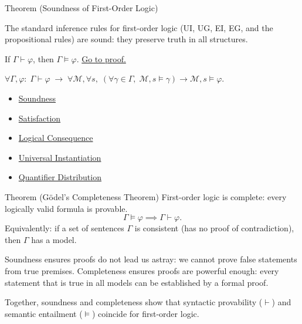 \begin{theorembox}{Theorem (Soundness of First-Order Logic)}
\begin{theorem}\label{thm:fol-sound}
The standard inference rules for first-order logic (UI, UG, EI, EG, and the
propositional rules) are sound: they preserve truth in all structures.

If $\Gamma \vdash \varphi$, then $\Gamma \models \varphi$.
\hyperref[prf:fol-sound]{Go to proof.}
\end{theorem}
\end{theorembox}

\begin{remark*}
$\forall \Gamma,\varphi:\; \Gamma\vdash\varphi \;\to\; \forall\mathcal{M},\forall s,\; (\forall\gamma\in\Gamma,\; \mathcal{M},s\models\gamma) \to \mathcal{M},s\models\varphi$.
\end{remark*}

\begin{dependencies}
\begin{itemize}
  \item \hyperref[def:fol-soundness]{Soundness}
  \item \hyperref[def:fol-satisfaction]{Satisfaction}
  \item \hyperref[def:log-consequence]{Logical Consequence}
  \item \hyperref[ax:predicate-logic-universal-instantiation]{Universal Instantiation}
  \item \hyperref[ax:predicate-logic-quantifier-distribution]{Quantifier Distribution}
\end{itemize}
\end{dependencies}

\begin{theorembox}{Theorem (G\"{o}del's Completeness Theorem)}
\label{thm:godel-complete}
First-order logic is complete: every logically valid formula is provable.
\[
\Gamma \models \varphi \implies \Gamma \vdash \varphi.
\]
Equivalently: if a set of sentences $\Gamma$ is consistent (has no proof of
contradiction), then $\Gamma$ has a model.
\end{theorembox}

\begin{remark*}
Soundness ensures proofs do not lead us astray: we cannot prove false statements
from true premises. Completeness ensures proofs are powerful enough: every
statement that is true in all models can be established by a formal proof.

Together, soundness and completeness show that syntactic provability ($\vdash$)
and semantic entailment ($\models$) coincide for first-order logic.
\end{remark*}

